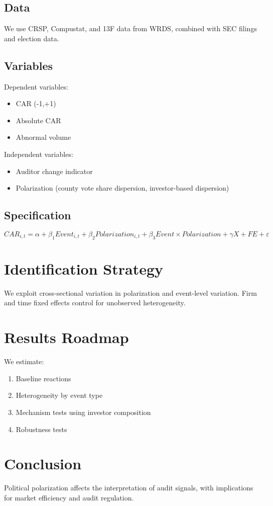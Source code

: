 \documentclass[12pt]{article}
\begin{document}
\subsection{Data}

We use CRSP, Compustat, and 13F data from WRDS, combined with SEC filings and election data.

\subsection{Variables}

Dependent variables:
\begin{itemize}
\item CAR (-1,+1)
\item Absolute CAR
\item Abnormal volume
\end{itemize}

Independent variables:
\begin{itemize}
\item Auditor change indicator
\item Polarization (county vote share dispersion, investor-based dispersion)
\end{itemize}

\subsection{Specification}

\begin{equation}
CAR_{i,t} = \alpha + \beta_1 Event_{i,t} + \beta_2 Polarization_{i,t} + \beta_3 Event \times Polarization + \gamma X + FE + \varepsilon
\end{equation}

\section{Identification Strategy}

We exploit cross-sectional variation in polarization and event-level variation. Firm and time fixed effects control for unobserved heterogeneity.

\section{Results Roadmap}

We estimate:
\begin{enumerate}
\item Baseline reactions
\item Heterogeneity by event type
\item Mechanism tests using investor composition
\item Robustness tests
\end{enumerate}

\section{Conclusion}

Political polarization affects the interpretation of audit signals, with implications for market efficiency and audit regulation.



\end{document}
